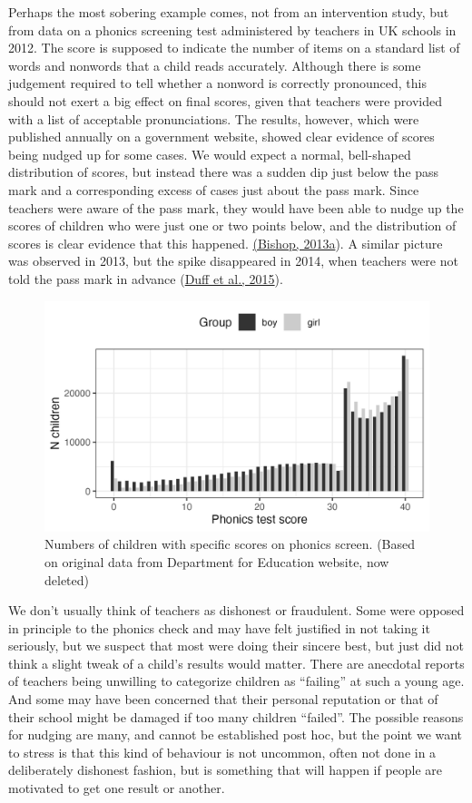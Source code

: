 \documentclass{krantz}
\begin{document}
Perhaps the most sobering example comes, not from an intervention study, but from data on a phonics screening test administered by teachers in UK schools in 2012. The score is supposed to indicate the number of items on a standard list of words and nonwords that a child reads accurately. Although there is some judgement required to tell whether a nonword is correctly pronounced, this should not exert a big effect on final scores, given that teachers were provided with a list of acceptable pronunciations. The results, however, which were published annually on a government website, showed clear evidence of scores being nudged up for some cases. We would expect a normal, bell-shaped distribution of scores, but instead there was a sudden dip just below the pass mark and a corresponding excess of cases just about the pass mark. Since teachers were aware of the pass mark, they would have been able to nudge up the scores of children who were just one or two points below, and the distribution of scores is clear evidence that this happened. \href{http://deevybee.blogspot.com/2013/10/good-and-bad-news-on-phonics-screen.html}(\protect\hyperlink{ref-bishop2013a}{Bishop, 2013a}). {A similar picture was observed in 2013}, but the spike disappeared in 2014, when teachers were not told the pass mark in advance (\protect\hyperlink{ref-duff2015}{Duff et al., 2015}).

\begin{figure}
\includegraphics[width=0.8\linewidth]{images_bw/phonics} \caption{Numbers of children with specific scores on phonics screen. (Based on original data from Department for Education website, now deleted)}\label{fig:phonicsfig}
\end{figure}

We don't usually think of teachers as dishonest or fraudulent. Some were opposed in principle to the phonics check and may have felt justified in not taking it seriously, but we suspect that most were doing their sincere best, but just did not think a slight tweak of a child's results would matter. There are anecdotal reports of teachers being unwilling to categorize children as ``failing'' at such a young age. And some may have been concerned that their personal reputation or that of their school might be damaged if too many children ``failed''. The possible reasons for nudging are many, and cannot be established post hoc, but the point we want to stress is that this kind of behaviour is not uncommon, often not done in a deliberately dishonest fashion, but is something that will happen if people are motivated to get one result or another.
\end{document}
